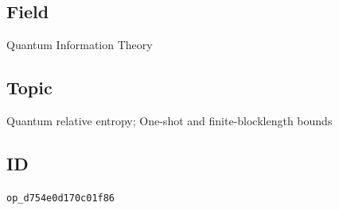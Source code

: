 \subsection*{Field}

Quantum Information Theory

\subsection*{Topic}

Quantum relative entropy; One-shot and finite-blocklength bounds

\subsection*{ID}

\texttt{op\_d754e0d170c01f86}
